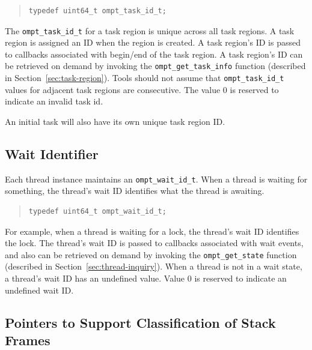 \documentclass{article}
\begin{document}
\begin{quote}
\begin{verbatim}
typedef uint64_t ompt_task_id_t;
\end{verbatim}
\end{quote}


\noindent
  The \verb|ompt_task_id_t| for a task region is unique
  across all task regions.    A task region is assigned an ID
  when the region is created. A task region's ID is
  passed to callbacks associated with begin/end of the
  task region. A task region's ID can be retrieved
  on demand by invoking the \verb|ompt_get_task_info|  function (described in Section~\ref{sec:task-region}).
  Tools should not assume that \verb|ompt_task_id_t| values for adjacent
  task regions are consecutive. 
  The value 0 is reserved to indicate an invalid task id.
  
  An initial task will also have its own unique task region ID.
  

 
\subsection{Wait Identifier}

  Each thread instance maintains an \verb|ompt_wait_id_t|. When a thread is waiting for something, the thread's wait ID identifies what the thread is awaiting. 


\begin{quote}
\begin{verbatim}
typedef uint64_t ompt_wait_id_t;
\end{verbatim}
\end{quote}

\noindent
For example, when a
  thread is waiting for a lock, the thread's wait ID identifies the lock.   The thread's wait ID is passed to
  callbacks associated with wait events, and also can be retrieved on
  demand by invoking the \verb|ompt_get_state| function (described in Section~\ref{sec:thread-inquiry}).
    When a thread is not in a wait state, a thread's wait ID has an undefined value.
  Value 0 is reserved to indicate an undefined wait ID.
 
\subsection{Pointers to Support Classification of Stack Frames}
\end{document}
